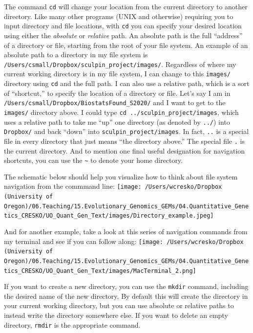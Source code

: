 \documentclass[
]{book}
\begin{document}
The command \texttt{cd} will change your location from the current directory to another directory. Like many other programs (UNIX and otherwise) requiring you to input directory and file locations, with \texttt{cd} you can specify your desired location using either the \emph{absolute} or \emph{relative} path. An absolute path is the full ``address'' of a directory or file, starting from the root of your file system. An example of an absolute path to a directory in my file system is \texttt{/Users/csmall/Dropbox/sculpin\_project/images/}. Regardless of where my current working directory is in my file system, I can change to this \texttt{images/} directory using \texttt{cd} and the full path. I can also use a relative path, which is a sort of ``shortcut,'' to specify the location of a directory or file. Let's say I am in \texttt{/Users/csmall/Dropbox/BiostatsFound\_S2020/} and I want to get to the \texttt{images/} directory above. I could type \texttt{cd\ ../sculpin\_project/images}, which uses a relative path to take me ``up'' one directory (as denoted by \texttt{../}) into \texttt{Dropbox/} and back ``down'' into \texttt{sculpin\_project/images}. In fact, \texttt{..} is a special file in every directory that just means ``the directory above.'' The special file \texttt{.} is the current directory. And to mention one final useful designation for navigation shortcuts, you can use the \texttt{\textasciitilde{}} to denote your home directory.

The schematic below should help you visualize how to think about file system navigation from the commmand line:
\texttt{[image: /Users/wcresko/Dropbox (University of Oregon)/06.Teaching/15.Evolutionary\_Genomics\_GEMs/04.Quantitative\_Genetics\_CRESKO/UO\_Quant\_Gen\_Text/images/Directory\_example.jpeg]}

And for another example, take a look at this series of navigation commands from my terminal and see if you can follow along:
\texttt{[image: /Users/wcresko/Dropbox (University of Oregon)/06.Teaching/15.Evolutionary\_Genomics\_GEMs/04.Quantitative\_Genetics\_CRESKO/UO\_Quant\_Gen\_Text/images/MacTerminal\_2.png]}

If you want to create a new directory, you can use the \texttt{mkdir} command, including the desired name of the new directory. By default this will create the directory in your current working directory, but you can use absolute or relative paths to instead write the directory somewhere else. If you want to delete an empty directory, \texttt{rmdir} is the appropriate command.
\end{document}
